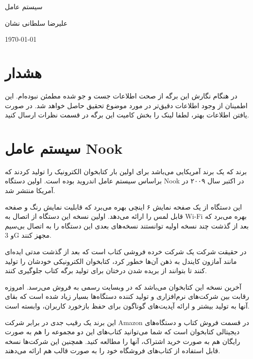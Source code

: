 \documentclass[20pt, a4paper]{article}
\begin{document}
\centerline{سیستم عامل }
\centerline{علیرضا سلطانی نشان}
\centerline{\today}

\section{هشدار}

در هنگام نگارش این برگه از صحت اطلاعات جست و جو شده مطمئن نبوده‌ام. این اطمینان
از وجود اطلاعات دقیق‌تر در مورد موضوع تحقیق حاصل خواهد شد. در صورت یافتن اطلاعات
بهتر، لطفا لینک را بخش کامیت این برگه در قسمت نظرات ارسال کنید.

\section{سیستم عامل Nook}

برند  که یک برند آمریکایی می‌باشد برای اولین بار
کتابخوان الکترونیک را تولید کردند که براساس سیستم عامل اندروید بوده است. اولین
دستگاه Nook در اکتبر سال ۲۰۰۹ در آمریکا منتشر شد.

این دستگاه از یک صفحه نمایش ۶ اینچی بهره می‌برد که قابلیت نمایش رنگ و صفحه قابل
لمس را ارائه می‌دهد. اولین نسخه این دستگاه از اتصال به Wi-Fi بهره‌ می‌برد که بعد
از گذشت چند نسخه اولیه توانستند نسخه‌های بعدی این دستگاه را به اتصال بی‌سیم و 3G
مجهز کنند.

در حقیقت شرکت  یک شرکت خرده فروشی کتاب است که بعد از
گذشت مدتی ایده‌ای مانند آمازون کایندل به ذهن آن‌ها خطور کرد، کتابخوان الکترونیکی
خودشان را تولید کنند تا بتوانند از بریده شدن درختان برای تولید برگه کتاب جلوگیری
کنند.

آخرین نسخه این کتابخوان  می‌باشد که در وبسایت رسمی
 به فروش می‌رسد. امروزه رقابت بین شرکت‌های نرم‌افزاری
و تولید کننده دستگاه‌ها بسیار زیاد شده است که بقای آنها به تولید بیشتر و ارائه
آپدیت‌های گوناگون برای حفظ بازخورد کاربران، وابسته است.

این برند یک رقیب جدی در برابر شرکت Amazon در قسمت فروش کتاب و دستگاه‌های
دیجیتالی کتابخوان است که شما می‌توانید کتاب‌های این دو مجموعه را هم به صورت
رایگان هم به صورت خرید اشتراک، آنها را مطالعه کنید. همچنین این شرکت‌ها نسخه قابل
استفاده از کتاب‌های فروشگاه خود را به صورت قالب  هم ارائه می‌دهند.
\end{document}
